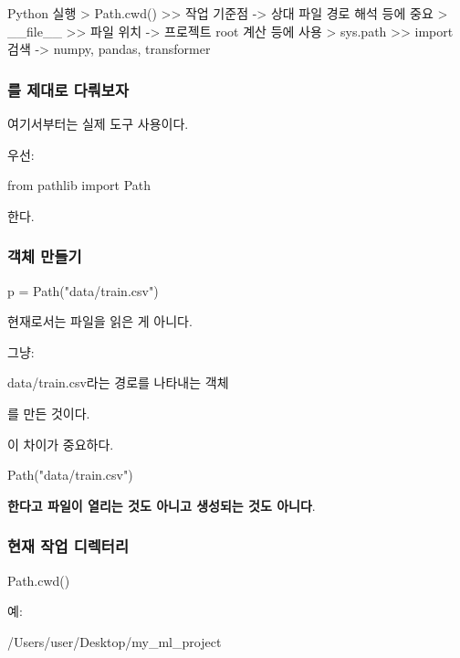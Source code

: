 \begin{dhkdir}
Python 실행
> Path.cwd()
>> 작업 기준점 -> 상대 파일 경로 해석 등에 중요
> __file__
>> 파일 위치 -> 프로젝트 root 계산 등에 사용
> sys.path
>> import 검색 -> numpy, pandas, transformer
\end{dhkdir}

\subsubsection{를 제대로 다뤄보자}

여기서부터는 실제 도구 사용이다.

우선:

\begin{dhkcode}
from pathlib import Path
\end{dhkcode}

한다.

\subsubsection{객체 만들기}

\begin{dhkcode}
p = Path("data/train.csv")
\end{dhkcode}

현재로서는 파일을 읽은 게 아니다.

그냥:
\begin{dhksmry}[centered]
data/train.csv라는 경로를 나타내는 객체
\end{dhksmry}

를 만든 것이다.

이 차이가 중요하다.

\begin{dhkcode}
Path("data/train.csv")
\end{dhkcode}

\textbf{한다고 파일이 열리는 것도 아니고 생성되는 것도 아니다}.

\subsubsection{현재 작업 디렉터리}

\begin{dhkcode}
Path.cwd()
\end{dhkcode}

예:

\begin{dhkzsh}
/Users/user/Desktop/my_ml_project
\end{dhkzsh}

